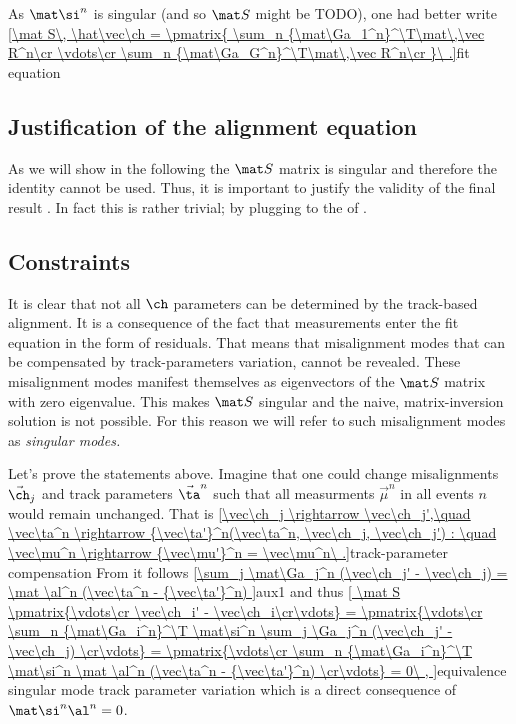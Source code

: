 As $\mat\si^n$ is singular (and so $\mat S$ might be TODO), one had better write
\eqref{\mat S\, \hat\vec\ch = \pmatrix{
\sum_n {\mat\Ga_1^n}^\T\mat\,\vec R^n\cr
\vdots\cr
\sum_n {\mat\Ga_G^n}^\T\mat\,\vec R^n\cr
}\ .}{fit equation}


\subsection{Justification of the alignment equation}

As we will show in the following the $\mat S$ matrix is singular and therefore the identity  cannot be used. Thus, it is important to justify the validity of the final result . In fact this is rather trivial; by plugging  to the \rhs{} of .

\subsection{Constraints}

It is clear that not all $\ch$ parameters can be determined by the track-based alignment. It is a consequence of the fact that measurements enter the fit equation  in the form of residuals. That means that misalignment modes that can be compensated by track-parameters variation, cannot be revealed. These misalignment modes manifest themselves as eigenvectors of the $\mat S$ matrix with zero eigenvalue. This makes $\mat S$ singular and the naive, matrix-inversion solution  is not possible. For this reason we will refer to such misalignment modes as \em{singular modes}.

Let's prove the statements above. Imagine that one could change misalignments $\vec\ch_j$ and track parameters $\vec\ta^n$ such that all measurments $\vec\mu^n$ in all events $n$ would remain unchanged. That is
\eqref{\vec\ch_j \rightarrow \vec\ch_j',\quad \vec\ta^n \rightarrow {\vec\ta'}^n(\vec\ta^n, \vec\ch_j, \vec\ch_j') : \quad \vec\mu^n \rightarrow {\vec\mu'}^n = \vec\mu^n\ .}{track-parameter compensation}
From  it follows
\eqref{\sum_j \mat\Ga_j^n (\vec\ch_j' - \vec\ch_j) = \mat \al^n (\vec\ta^n - {\vec\ta'}^n) }{aux1}
and thus
\eqref{
\mat S \pmatrix{\vdots\cr \vec\ch_i' - \vec\ch_i\cr\vdots} = 
\pmatrix{\vdots\cr \sum_n {\mat\Ga_i^n}^\T \mat\si^n \sum_j \Ga_j^n (\vec\ch_j' - \vec\ch_j) \cr\vdots} =
\pmatrix{\vdots\cr \sum_n {\mat\Ga_i^n}^\T \mat\si^n \mat \al^n (\vec\ta^n - {\vec\ta'}^n) \cr\vdots} = 0\ ,
}{equivalence singular mode track parameter variation}
which is a direct consequence of $\mat\si^n \al^n = 0$.

